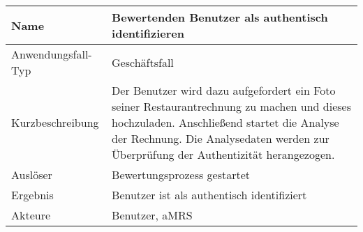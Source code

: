 \begin{table}[H]
    \centering
    \label{}
    \begin{tabularx}{\textwidth}{| l | X |}
        \hline
        Name               & Bewertenden Benutzer als authentisch identifizieren                                                                                                                                                                             \\
        \hline
        Anwendungsfall-Typ & Geschäftsfall                                                                                                                                                                                                                   \\
        \hline
        Kurzbeschreibung   & Der Benutzer wird dazu aufgefordert ein Foto seiner Restaurantrechnung zu machen und dieses hochzuladen. Anschließend startet die Analyse der Rechnung. Die Analysedaten werden zur Überprüfung der Authentizität herangezogen. \\
        \hline
        Auslöser           & Bewertungsprozess gestartet                                                                                                                                                                                                     \\
        \hline
        Ergebnis           & Benutzer ist als authentisch identifiziert                                                                                                                                                                                      \\
        \hline
        Akteure            & Benutzer, \ac{aMRS}                                                                                                                                                                                                             \\
        \hline
    \end{tabularx}
\end{table}

